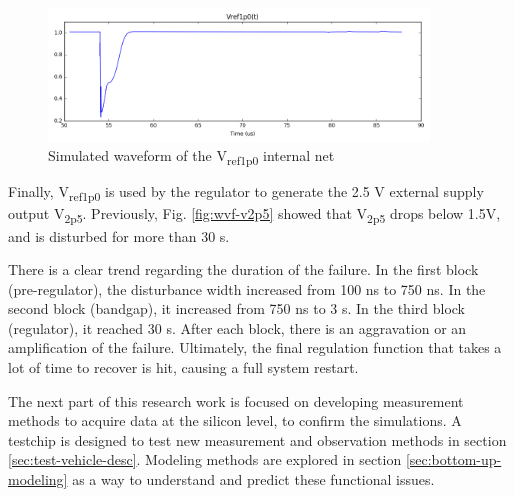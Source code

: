 \begin{figure}[!h]
  \centering
  \includegraphics[width=0.9\textwidth]{src/3/figures/v1p0.png}
  \caption{Simulated waveform of the V\textsubscript{ref1p0} internal net}
  \label{fig:wvf-v1p0}
\end{figure}

Finally, V\textsubscript{ref1p0} is used by the regulator to generate the 2.5 V external supply output V\textsubscript{2p5}.
Previously,  Fig. \ref{fig:wvf-v2p5} showed that V\textsubscript{2p5} drops below 1.5V, and is disturbed for more than 30 \textmugreek{}s.

There is a clear trend regarding the duration of the failure.
In the first block (pre-regulator), the disturbance width increased from 100 ns to 750 ns.
In the second block (bandgap), it increased from 750 ns to 3 \textmugreek{}s.
In the third block (regulator), it reached 30 \textmugreek{}s.
After each block, there is an aggravation or an amplification of the failure.
Ultimately, the final regulation function that takes a lot of time to recover is hit, causing a full system restart.

The next part of this research work is focused on developing measurement methods to acquire data at the silicon level, to confirm the simulations.
A testchip is designed to test new measurement and observation methods in section \ref{sec:test-vehicle-desc}.
Modeling methods are explored in section \ref{sec:bottom-up-modeling} as a way to understand and predict these functional issues.
